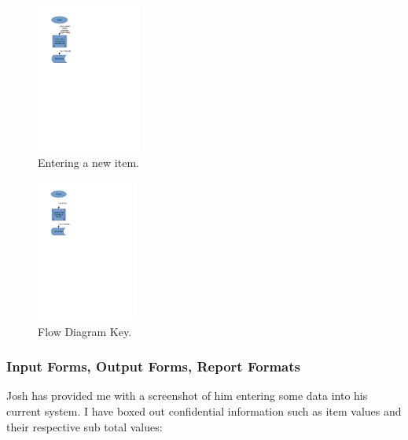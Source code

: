 \begin{figure}[H]
    \centerline{\includegraphics[width=130px]{./Analysis/Dataflow/DFD_analysis_new_item.pdf}}
    \caption{Entering a new item.} \label{fig:print_function_result}
\end{figure}

\begin{figure}[H]
    \centerline{\includegraphics[width=125px]{./Analysis/Dataflow/DFD_analysis_update_item.pdf}}
    \caption{Flow Diagram Key.} \label{fig:print_function_result}
\end{figure}

\newpage

\subsubsection{Input Forms, Output Forms, Report Formats}

Josh has provided me with a screenshot of him entering some data into his current system. I have boxed out confidential information such as item values and their respective sub total values:\\

